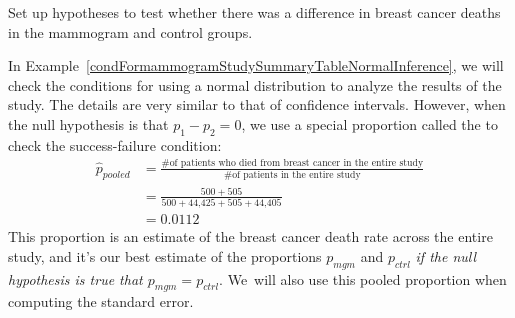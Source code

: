 \D{\newpage}

\begin{exercisewrap}
\begin{nexercise} \label{htFormammogramStudySummaryTable}
Set up hypotheses to test whether there was a difference
in breast cancer deaths in the mammogram and control groups.\footnotemark
\end{nexercise}
\end{exercisewrap}

In Example~\ref{condFormammogramStudySummaryTableNormalInference},
we will check the conditions for using a normal distribution to
analyze the results of the study.
The details are very similar to that of confidence intervals.
However, when the null hypothesis is that $p_1 - p_2 = 0$,
we use a special proportion called the
 to check the success-failure condition:
\begin{align*}
\hat{p}_{\textit{pooled}}
    &= \frac
        {\text{\# of patients who died from breast cancer in the
            entire study}}
        {\text{\# of patients in the entire study}} \\
	&= \frac{500 + 505}{500 + \text{44,425} + 505 + \text{44,405}} \\
	&= 0.0112
\end{align*}
This proportion is an estimate of the breast cancer death rate
across the entire study, and it's our best estimate of the
proportions $p_{mgm}$ and $p_{ctrl}$
\emph{if the null hypothesis is true that $p_{mgm} = p_{ctrl}$}.
We~will also use this pooled proportion when computing
the standard error.

